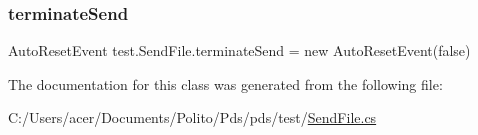 \subsubsection{\texorpdfstring{terminate\+Send}{terminateSend}}
{\footnotesize\ttfamily Auto\+Reset\+Event test.\+Send\+File.\+terminate\+Send = new Auto\+Reset\+Event(false)}



The documentation for this class was generated from the following file\+:\begin{DoxyCompactItemize}
\item 
C\+:/\+Users/acer/\+Documents/\+Polito/\+Pds/pds/test/\hyperlink{_send_file_8cs}{Send\+File.\+cs}\end{DoxyCompactItemize}
